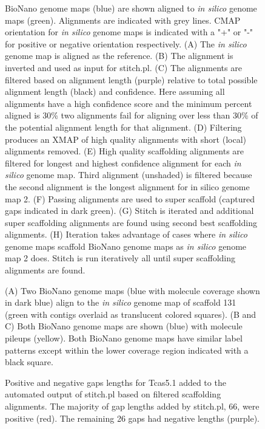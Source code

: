 \documentclass{bmcart}
\begin{document}
\begin{backmatter}
\begin{figure}[h!]
{      BioNano genome maps (blue) are shown aligned to \textit{in silico} genome maps (green). Alignments are indicated with grey lines. CMAP orientation for \textit{in silico} genome maps is indicated with a "+" or "-" for positive or negative orientation respectively. (A) The \textit{in silico} genome map is aligned as the reference. (B) The alignment is inverted and used as input for stitch.pl. (C) The alignments are filtered based on alignment length (purple) relative to total possible alignment length (black) and confidence. Here assuming all alignments have a high confidence score and the minimum percent aligned is 30\% two alignments fail for aligning over less than 30\% of the potential alignment length for that alignment. (D) Filtering produces an XMAP of high quality alignments with short (local) alignments removed. (E) High quality scaffolding alignments are filtered for longest and highest confidence alignment for each \textit{in silico} genome map. Third alignment (unshaded) is filtered because the second alignment is the longest alignment for {in silico} genome map 2. (F) Passing alignments are used to super scaffold (captured gaps indicated in dark green). (G) Stitch is iterated and additional super scaffolding alignments are found using second best scaffolding alignments. (H) Iteration takes advantage of cases where \textit{in silico} genome maps scaffold BioNano genome maps as \textit{in silico} genome map 2 does. Stitch is run iteratively all until super scaffolding alignments are found.}
      \end{figure}      
\begin{figure}[h!]
	\caption{
		(A) Two BioNano genome maps (blue with molecule coverage shown in dark blue) align to the \textit{in silico} genome map of scaffold 131 (green with contigs overlaid as translucent colored squares). (B and C) Both BioNano genome maps are shown (blue) with molecule pileups (yellow). Both BioNano genome maps have similar label patterns except within the lower coverage region indicated with a black square.}
\end{figure}  
\begin{figure}[h!]
	\caption{
		Positive and negative gaps lengths for Tcas5.1 added to the automated output of stitch.pl based on filtered scaffolding alignments. The majority of gap lengths added by stitch.pl, 66, were positive (red). The remaining 26 gaps had negative lengths (purple).}
      \end{figure}                      

\end{backmatter}
\end{document}
